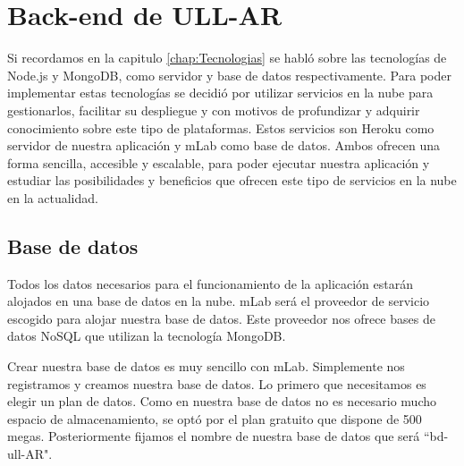 %
%
%  
  
  
\chapter{Back-end de ULL-AR} \label{chap:BackEnd} 

Si recordamos en la capitulo \ref{chap:Tecnologias} se habló sobre las tecnologías de Node.js y MongoDB, como servidor y base de datos respectivamente. Para poder implementar estas tecnologías se decidió por utilizar servicios en la nube para gestionarlos, facilitar su despliegue y con motivos de profundizar y adquirir conocimiento sobre este tipo de plataformas. Estos servicios son Heroku como servidor de nuestra aplicación y mLab como base de datos. Ambos ofrecen una forma sencilla, accesible y escalable, para poder ejecutar nuestra aplicación y estudiar las posibilidades y beneficios que ofrecen este tipo de servicios en la nube en la actualidad.

\section{Base de datos}

Todos los datos necesarios para el funcionamiento de la aplicación estarán alojados en una base de datos en la nube. mLab será el proveedor de servicio escogido para alojar nuestra base de datos. Este proveedor nos ofrece bases de datos NoSQL que utilizan la tecnología MongoDB.

Crear nuestra base de datos es muy sencillo con mLab. Simplemente nos registramos y creamos nuestra base de datos. Lo primero que necesitamos es elegir un plan de datos. Como en nuestra base de datos no es necesario mucho espacio de almacenamiento, se optó por el plan gratuito que dispone de 500 megas. Posteriormente fijamos el nombre de nuestra base de datos que será ``bd-ull-AR".

